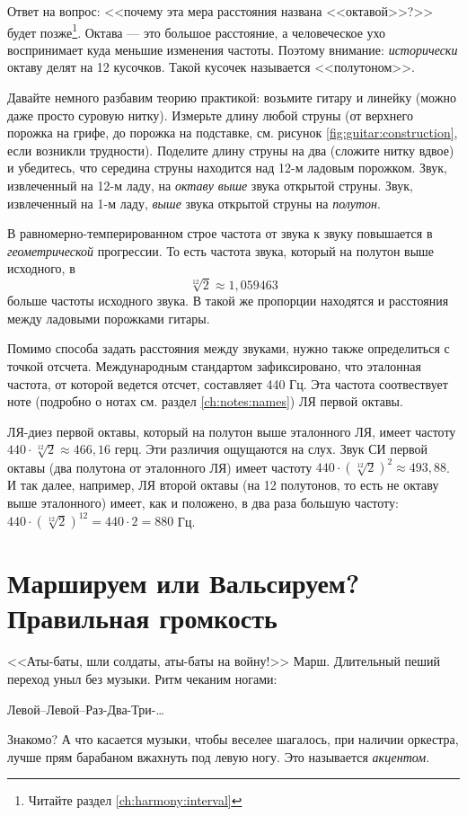 Ответ на вопрос: <<почему эта мера расстояния названа <<октавой>>?>> будет позже\footnote{Читайте раздел \ref{ch:harmony:interval}}. Октава --- это большое расстояние, а человеческое ухо воспринимает куда меньшие изменения частоты. Поэтому внимание: \emph{исторически} октаву делят на 12 кусочков. Такой кусочек называется <<полутоном>>.

\begin{Example}
    Давайте немного разбавим теорию практикой: возьмите гитару и линейку (можно даже просто суровую нитку). Измерьте длину любой струны (от верхнего порожка на грифе, до порожка на подставке, см. рисунок \ref{fig:guitar:construction}, если возникли трудности). Поделите длину струны на два (сложите нитку вдвое) и убедитесь, что середина струны находится над 12-м ладовым порожком. Звук, извлеченный на 12-м ладу, на \emph{октаву выше} звука открытой струны. Звук, извлеченный на 1-м ладу, \emph{выше} звука открытой струны на \emph{полутон}.
\end{Example}

В равномерно-темперированном строе частота от звука к звуку повышается в \emph{геометрической} прогрессии. То есть частота звука, который на полутон выше исходного, в \[\sqrt[12]{2}\approx 1,059463\] больше частоты исходного звука. В такой же пропорции находятся и расстояния между ладовыми порожками гитары.

Помимо способа задать расстояния между звуками, нужно также определиться с точкой отсчета. Международным стандартом зафиксировано, что эталонная частота, от которой ведется отсчет, составляет 440 Гц. Эта частота соотвествует ноте (подробно о нотах см. раздел \ref{ch:notes:names}) ЛЯ первой октавы. 

ЛЯ-диез первой октавы, который на полутон выше эталонного ЛЯ, имеет частоту $440\cdot\sqrt[12]{2}\approx 466,16$ герц. Эти различия ощущаются на слух. Звук СИ первой октавы (два полутона от эталонного ЛЯ) имеет частоту $440\cdot(\sqrt[12]{2})^2\approx 493,88$. И так далее, например, ЛЯ второй октавы (на 12 полутонов, то есть не октаву выше эталонного) имеет, как и положено, в два раза большую частоту: $440\cdot(\sqrt[12]{2})^{12}=440\cdot 2=880$ Гц.


\section{Маршируем или Вальсируем? Правильная громкость}
\label{ch:music:volume}

<<Аты-баты, шли солдаты, аты-баты на войну!>> Марш. Длительный пеший переход уныл без музыки. Ритм чеканим ногами: 
\begin{center}
    Левой--Левой--Раз-Два-Три-\ldots 
\end{center}
Знакомо? А что касается музыки, чтобы веселее шагалось, при наличии оркестра, лучше прям барабаном вжахнуть под левую ногу. Это называется \emph{акцентом}. 

